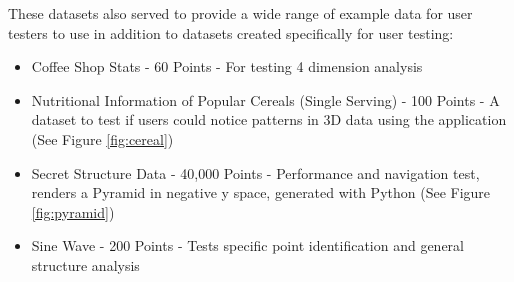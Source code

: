 These datasets also served to provide a wide range of example data for user testers to use in addition to datasets created specifically for user testing:
\begin{itemize}
    \item Coffee Shop Stats - 60 Points - For testing 4 dimension analysis
    \item Nutritional Information of Popular Cereals (Single Serving) - 100 Points - A dataset to test if users could notice patterns in 3D data using the application (See Figure \ref{fig:cereal})
    \item Secret Structure Data - 40,000 Points - Performance and navigation test, renders a Pyramid in negative y space, generated with Python (See Figure \ref{fig:pyramid})
    \item Sine Wave - 200 Points - Tests specific point identification and general structure analysis
\end{itemize}

